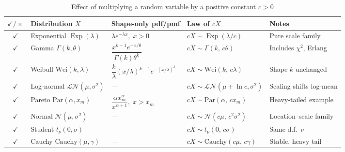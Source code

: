\documentclass{article}
\begin{document}
\begin{table}[ht]
\centering
\caption{Effect of multiplying a random variable by a positive constant $c>0$}
\small
\renewcommand{\arraystretch}{1.2}
\begin{tabular}{@{}c l l l p{4.8cm}@{}}
\toprule
$\checkmark/\times$ &
Distribution $X$ &
Shape-only pdf/pmf &
Law of $cX$ &
Notes\\
\midrule
$\checkmark$ & Exponential $\operatorname{Exp}(\lambda)$
             & $\lambda e^{-\lambda x},\;x>0$
             & $cX\sim\operatorname{Exp}(\lambda/c)$
             & Pure scale family \\

$\checkmark$ & Gamma $\Gamma(k,\theta)$
             & $\dfrac{x^{k-1}e^{-x/\theta}}{\Gamma(k)\theta^{k}}$
             & $cX\sim\Gamma(k,\,c\theta)$
             & Includes $\chi^2$, Erlang \\

$\checkmark$ & Weibull $\mathrm{Wei}(k,\lambda)$
             & $\dfrac{k}{\lambda}(x/\lambda)^{k-1}e^{-(x/\lambda)^{k}}$
             & $cX\sim\mathrm{Wei}(k,\,c\lambda)$
             & Shape $k$ unchanged \\

$\checkmark$ & Log-normal $\mathcal{LN}(\mu,\sigma^{2})$
             & —
             & $cX\sim\mathcal{LN}(\mu+\ln c,\sigma^{2})$
             & Scaling shifts log-mean \\

$\checkmark$ & Pareto $\mathrm{Par}(\alpha,x_{m})$
             & $\dfrac{\alpha x_{m}^{\alpha}}{x^{\alpha+1}},\;x>x_{m}$
             & $cX\sim\mathrm{Par}(\alpha,\,c x_{m})$
             & Heavy-tailed example \\

$\checkmark$ & Normal $\mathcal N(\mu,\sigma^{2})$
             & —
             & $cX\sim\mathcal N(c\mu,\,c^{2}\sigma^{2})$
             & Location–scale family \\

$\checkmark$ & Student-$t_{\nu}(0,\sigma)$
             & —
             & $cX\sim t_{\nu}(0,\,c\sigma)$
             & Same d.f.\ $\nu$ \\

$\checkmark$ & Cauchy $\mathrm{Cauchy}(\mu,\gamma)$
             & —
             & $cX\sim\mathrm{Cauchy}(c\mu,\,c\gamma)$
             & Stable, heavy tail \\


\end{tabular}
\end{table}
\end{document}
